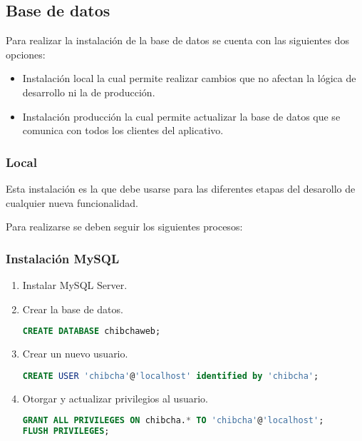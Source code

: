 \subsection{Base de datos}
Para realizar la instalación de la base de datos se cuenta con las siguientes dos opciones:
\begin{itemize}
    \item Instalación local la cual permite realizar cambios que no afectan la lógica de desarrollo ni la de producción.
    \item Instalación producción la cual permite actualizar la base de datos que se comunica con todos los clientes del aplicativo.
\end{itemize}

\subsubsection{Local}
Esta instalación es la que debe usarse para las diferentes etapas del desarollo de cualquier nueva funcionalidad.

Para realizarse se deben seguir los siguientes procesos:

\subsubsection*{Instalación MySQL}
\begin{enumerate}
	\item Instalar MySQL Server.
	\item Crear la base de datos.
        \begin{lstlisting}[language=sql]
CREATE DATABASE chibchaweb;
        \end{lstlisting}
    \item Crear un nuevo usuario.
        \begin{lstlisting}[language=sql]
CREATE USER 'chibcha'@'localhost' identified by 'chibcha';
        \end{lstlisting}
	\item Otorgar y actualizar privilegios al usuario.
        \begin{lstlisting}[language=sql]
GRANT ALL PRIVILEGES ON chibcha.* TO 'chibcha'@'localhost';
FLUSH PRIVILEGES;
        \end{lstlisting}
\end{enumerate}

